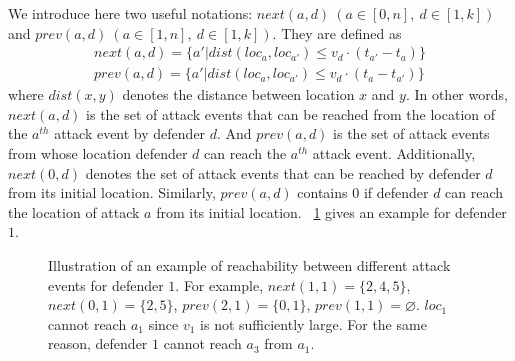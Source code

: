We introduce here two useful notations: $next(a, d)\ (a\in[0, n],\ d\in[1,k])$ and $prev(a, d)\ (a\in[1,n],\ d \in [1,k])$.
They are defined as
\begin{align}
next(a, d) = \{ a'| dist(loc_a, loc_{a'}) \leq v_d \cdot (t_{a'} - t_a) \}    \\
prev(a, d) = \{ a'| dist(loc_a, loc_{a'}) \leq v_d \cdot (t_a - t_{a'}) \}    
\end{align}
where $dist(x,y)$ denotes the distance between location $x$ and $y$. 
In other words, $next(a, d)$ is the set of 
attack events that can be reached from the location of the $a^{th}$ attack event by defender $d$. 
And $prev(a,d)$ is the set of attack events from whose location defender $d$ can reach the $a^{th}$ attack event. 
Additionally, $next(0, d)$ denotes the set of attack events that can be reached by defender $d$ from its initial location.
Similarly, $prev(a, d)$ contains $0$ if defender $d$ can reach the location of attack $a$ from its initial location.
~\ref{fig:bd-next_prev} gives an example for defender $1$.

\begin{figure}[h]
    \centering
{}
    \caption[An example of reachability between different attack events for defender $1$]
    {Illustration of an example of reachability between different attack events for defender $1$.  
    For example, $next(1, 1) = \{2,4,5\}$, $next(0,1)=\{2,5\}$, $prev(2, 1) =\{0, 1\}$, $prev(1,1)=\varnothing$.
    $loc_1$ cannot reach $a_1$ since $v_1$ is not sufficiently large. For the same reason, defender $1$ cannot reach $a_3$ from $a_1$.
    }
    \label{fig:bd-next_prev}
\end{figure}

